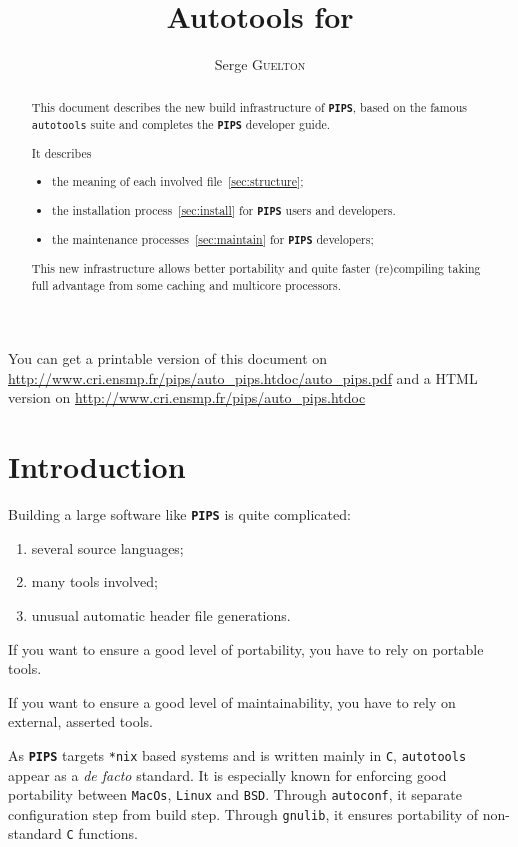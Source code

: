 \documentclass[a4paper]{article}
\title{Autotools for \PIPS{}}
\author{Serge \textsc{Guelton}}
\newcommand{\PIPS}{\textbf{\texttt{PIPS}}}
\newcommand{\autoconf}{\texttt{autoconf}}
\newcommand{\gnulib}{\texttt{gnulib}}
\newcommand{\PipsAutotoolsGuidePDF}{\url{http://www.cri.ensmp.fr/pips/auto_pips.htdoc/auto_pips.pdf}\xspace}
\newcommand{\PipsAutotoolsGuideHTDOC}{\url{http://www.cri.ensmp.fr/pips/auto_pips.htdoc}\xspace}
\begin{document}
\maketitle

\begin{abstract}
This document describes the new build infrastructure of \PIPS{},
 based on the famous \texttt{autotools} suite and completes the \PIPS{}
 developer guide.

It describes
\begin{itemize}
\item the meaning of each involved file~\ref{sec:structure};
\item the installation process~\ref{sec:install} for \PIPS{} users and developers.
\item the maintenance processes~\ref{sec:maintain} for \PIPS{} developers;
\end{itemize}

This new infrastructure allows better portability and quite faster
(re)compiling taking full advantage from some caching and multicore
processors.
\end{abstract}

You can get a printable version of this document on\\
\PipsAutotoolsGuidePDF{} and a HTML version on \PipsAutotoolsGuideHTDOC

\section{Introduction}

Building a large software like \PIPS{} is quite complicated:
\begin{enumerate}
\item several source languages;
\item many tools involved;
\item unusual automatic header file generations.
\end{enumerate}

If you want to ensure a good level of portability,
you have to rely on portable tools.

If you want to ensure a good level of maintainability,
you have to rely on external, asserted tools.

As \PIPS{} targets \texttt{*nix} based systems and is written mainly in \texttt{C},
\texttt{autotools} appear as a \emph{de facto} standard.
It is especially known for enforcing good portability between \texttt{MacOs}, \texttt{Linux} and \texttt{BSD}.
Through \autoconf{}, it separate configuration step from build step.
Through \gnulib{}, it ensures portability of non-standard \texttt{C} functions.
\end{document}
